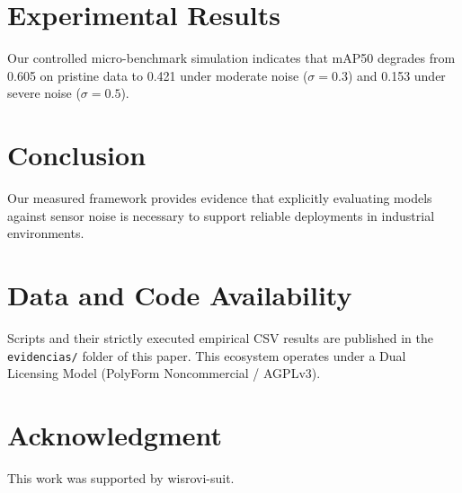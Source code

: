 \documentclass[conference]{IEEEtran}
\begin{document}
\section{Experimental Results}
Our controlled micro-benchmark simulation indicates that mAP50 degrades from 0.605 on pristine data to 0.421 under moderate noise ($\sigma=0.3$) and 0.153 under severe noise ($\sigma=0.5$). 

\section{Conclusion}
Our measured framework provides evidence that explicitly evaluating models against sensor noise is necessary to support reliable deployments in industrial environments.

\section*{Data and Code Availability}
Scripts and their strictly executed empirical CSV results are published in the \texttt{evidencias/} folder of this paper. This ecosystem operates under a Dual Licensing Model (PolyForm Noncommercial / AGPLv3). 

\section*{Acknowledgment}
This work was supported by wisrovi-suit.



\end{document}
